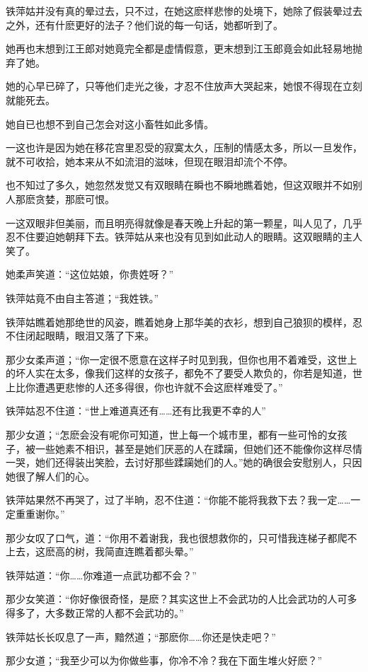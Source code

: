 \documentclass[12pt,oneside]{book}
\begin{document}
铁萍姑并没有真的晕过去，只不过，在她这麽样悲惨的处境下，她除了假装晕过去之外，还有什麽更好的法子？他们说的每一句话，她都听到了。

她再也末想到江王郎对她竟完全都是虚情假意，更末想到江玉郎竟会如此轻易地抛弃了她。

她的心早已碎了，只等他们走光之後，才忍不住放声大哭起来，她恨不得现在立刻就能死去。

她自已也想不到自己怎会对这小畜牲如此多情。

一这也许是因为她在移花宫里忍受的寂寞太久，压制的情感太多，所以一旦发作，就不可收拾，她本来从不如流泪的滋味，但现在眼泪却流个不停。

也不知过了多久，她忽然发觉又有双眼睛在瞬也不瞬地瞧着她，但这双眼并不如别人那麽贪婪，那麽可恨。

一这双眼非但美丽，而且明亮得就像是春天晚上升起的第一颗星，叫人见了，几乎忍不住要迫她朝拜下去。铁萍姑从来也没有见到如此动人的眼睛。这双眼睛的主人笑了。

她柔声笑道：``这位姑娘，你贵姓呀？''

铁萍姑竟不由自主答道；``我姓铁。''

铁萍姑瞧着她那绝世的风姿，瞧着她身上那华美的衣衫，想到自己狼狈的模样，忍不住闭起眼睛，眼泪又落了下来。

那少女柔声道；``你一定很不愿意在这样子时见到我，但你也用不着难受，这世上的坏人实在太多，像我们这样的女孩子，都免不了要受人欺负的，你若是知道，世上比你遭遇更悲惨的人还多得很，你也许就不会这麽样难受了。''

铁萍姑忍不住道：``世上难道真还有\ldots\ldots 还有比我更不幸的人''

那少女道；``怎麽会没有呢你可知道，世上每一个城市里，都有一些可怜的女孩子，被一些她素不相识，甚至是她们厌恶的人在蹂躏，但她们还不能像你这样尽情一哭，她们还得装出笑脸，去讨好那些蹂躏她们的人。''她的确很会安慰别人，只因她很了解人们的心。

铁萍姑果然不再哭了，过了半晌，忍不住道：``你能不能将我救下去？我一定\ldots\ldots 一定重重谢你。''

那少女叹了口气，道：``你用不着谢我，我也很想救你的，只可惜我连梯子都爬不上去，这麽高的树，我简直连瞧着都头晕。''

铁萍姑道：``你\ldots\ldots 你难道一点武功都不会？''

那少女笑道：``你好像很奇怪，是麽？其实这世上不会武功的人比会武功的人可多得多了，大多数正常的人都不会武功的。''

铁萍姑长长叹息了一声，黯然道；``那麽你\ldots\ldots 你还是快走吧？''

那少女道；``我至少可以为你做些事，你冷不冷？我在下面生堆火好麽？''
\end{document}
